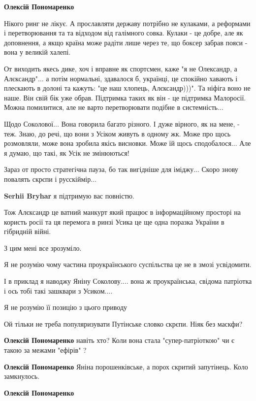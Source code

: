 \begin{itemize}
\begin{itemize} %
\textbf{Олексій Пономаренко} 

Нікого ринг не лікує. А прославляти державу потрібно не кулаками, а реформами і
перетворювання та та відходом від галімного совка. Кулаки - це добре, але як
доповнення, а якщо країна може радіти лише через те, що боксер забрав пояси -
вона у великій халепі.

От виходить якесь дике, хоч і вправне як спортсмен, каже "я не Олександр, а
Алєксандр"... а потім нормальні, здавалося б, українці, це спокійно хавають і
плескають в долоні та кажуть: "це наш хлопець, Алєксандр)))". Та ніфіга воно не
наше. Він свій бік уже обрав. Підтримка таких як він - це підтримка Малоросії.
Можна помилитися, але не варто перетворювати подібне в системність...

Щодо Соколової... Вона говорила багато різного. І дуже вірного, як на мене, -
теж. Знаю, до речі, що вони з Усіком живуть в одному жк. Може про щось
розмовляли, може вона зробила якісь висновки. Може їй щось сподобалося... Але я
думаю, що такі, як Усік не змінюються! 

Зараз от просто стратегічна пауза, бо так вигідніше для іміджу... Скоро знову
повалять скрєпи і русскіймір...


\textbf{Serhii Bryhar} я підтримую вас повністю.

Тож Алєксандр це ватний манкурт який працює в інформаційному просторі на
користь росії та ця перемога в ринзі Усика це ще одна поразка України в
гібридній війні.

З цим мені все зрозуміло.

Я не розумію чому частина проукраїнського суспільства це не в змозі усвідомити.

І в приклад я наводжу Яніну Соколову.... вона ж проукраїнська, свідома
патріотка і ось тобі такі зашквари з Усиком....

Я не розумію її позицію з цього приводу

Ой тільки не треба популяризувати Путінське словко скрєпи. Ніяк без маскфи?

\textbf{Олексій Пономаренко} навіть хто?
Коли вона стала "супер-патріоткою" чи є такою за межами "ефірів" ?

\textbf{Олексій Пономаренко} Яніна порошенківське, а порох скритий запутінець. Коло замкнулось.

\textbf{Олексій Пономаренко} 


\end{itemize}
\end{itemize}

